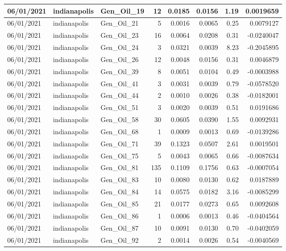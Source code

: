 \documentclass[
  letterpaper,
  DIV=11,
  numbers=noendperiod]{scrartcl}
\begin{document}
\begin{tabular}{l|l|l|r|r|r|r|r}
\hline
06/01/2021 & indianapolis & Gen\_Oil\_19 & 12 & 0.0185 & 0.0156 & 1.19 & 0.0019659\\
\hline
06/01/2021 & indianapolis & Gen\_Oil\_21 & 5 & 0.0016 & 0.0065 & 0.25 & 0.0079127\\
\hline
06/01/2021 & indianapolis & Gen\_Oil\_23 & 16 & 0.0064 & 0.0208 & 0.31 & -0.0240047\\
\hline
06/01/2021 & indianapolis & Gen\_Oil\_24 & 3 & 0.0321 & 0.0039 & 8.23 & -0.2045895\\
\hline
06/01/2021 & indianapolis & Gen\_Oil\_26 & 12 & 0.0048 & 0.0156 & 0.31 & 0.0046879\\
\hline
06/01/2021 & indianapolis & Gen\_Oil\_39 & 8 & 0.0051 & 0.0104 & 0.49 & -0.0003988\\
\hline
06/01/2021 & indianapolis & Gen\_Oil\_41 & 3 & 0.0031 & 0.0039 & 0.79 & -0.0578520\\
\hline
06/01/2021 & indianapolis & Gen\_Oil\_44 & 2 & 0.0010 & 0.0026 & 0.38 & -0.0182001\\
\hline
06/01/2021 & indianapolis & Gen\_Oil\_51 & 3 & 0.0020 & 0.0039 & 0.51 & 0.0191686\\
\hline
06/01/2021 & indianapolis & Gen\_Oil\_58 & 30 & 0.0605 & 0.0390 & 1.55 & 0.0092931\\
\hline
06/01/2021 & indianapolis & Gen\_Oil\_68 & 1 & 0.0009 & 0.0013 & 0.69 & -0.0139286\\
\hline
06/01/2021 & indianapolis & Gen\_Oil\_71 & 39 & 0.1323 & 0.0507 & 2.61 & 0.0019501\\
\hline
06/01/2021 & indianapolis & Gen\_Oil\_75 & 5 & 0.0043 & 0.0065 & 0.66 & -0.0087634\\
\hline
06/01/2021 & indianapolis & Gen\_Oil\_81 & 135 & 0.1109 & 0.1756 & 0.63 & -0.0007054\\
\hline
06/01/2021 & indianapolis & Gen\_Oil\_83 & 10 & 0.0080 & 0.0130 & 0.62 & 0.0187889\\
\hline
06/01/2021 & indianapolis & Gen\_Oil\_84 & 14 & 0.0575 & 0.0182 & 3.16 & -0.0085299\\
\hline
06/01/2021 & indianapolis & Gen\_Oil\_85 & 21 & 0.0177 & 0.0273 & 0.65 & 0.0092608\\
\hline
06/01/2021 & indianapolis & Gen\_Oil\_86 & 1 & 0.0006 & 0.0013 & 0.46 & -0.0404564\\
\hline
06/01/2021 & indianapolis & Gen\_Oil\_87 & 10 & 0.0091 & 0.0130 & 0.70 & -0.0402059\\
\hline
06/01/2021 & indianapolis & Gen\_Oil\_92 & 2 & 0.0014 & 0.0026 & 0.54 & -0.0040569\\

\end{tabular}
\end{document}
